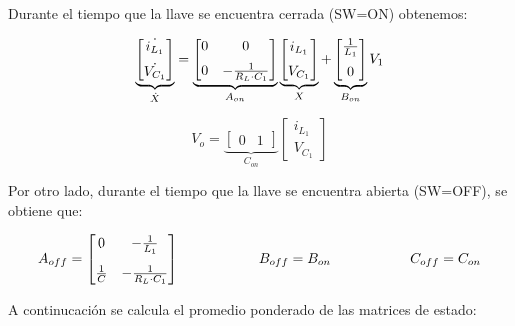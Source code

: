 \documentclass[e4_tp2_main.tex]{subfiles}
\begin{document}
Durante el tiempo que la llave se encuentra cerrada (SW=ON) obtenemos:

\begin{equation}
\underbrace{
\begin{bmatrix}
\dot{i_{L_1}} \vspace{0.2cm} \\
\dot{V_{C_1}} 
\end{bmatrix}
}_{\dot{X}}
=
\underbrace{
\begin{bmatrix}
{0} & {0} \vspace{0.2cm}\\
{0} & {-\frac{1}{R_L \cdot C_1}} 
\end{bmatrix}
}_{A_{on}}
\underbrace{
\begin{bmatrix}
{i_{L_1}} \vspace{0.2cm}\\
{V_{C_1}} 
\end{bmatrix}
}_{X}
+
\underbrace{
\begin{bmatrix}
{\frac{1}{L_1}} \vspace{0.2cm}\\
{0} 
\end{bmatrix}
}_{B_{on}}
V_1
\end{equation}


\begin{equation}
V_o =
\underbrace{
\begin{bmatrix}
{0} & {1} 
\end{bmatrix}
}_{C_{on}}
\begin{bmatrix}
{i_{L_1}} \\
{V_{C_1}} 
\end{bmatrix}
\end{equation}

Por otro lado, durante el tiempo que la llave se encuentra abierta (SW=OFF), se obtiene que: 

\begin{equation}
A_{off} = 
\begin{bmatrix}
{0} & {- \frac{1}{L_1}} \vspace{0.3cm}\\ 
{\frac{1}{C}} & {-\frac{1}{R_L \cdot C_1}}
\end{bmatrix}  
\hspace{2cm} B_{off}=B_{on}  
\hspace{2cm} C_{off} = C_{on}
\end{equation}


A continucaci\'on se calcula el promedio ponderado de las matrices de estado:
\end{document}
